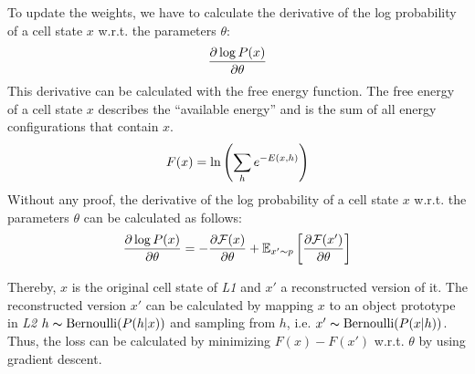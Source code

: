 To update the weights, we have to calculate the derivative of the log probability of a cell state $x$ w.r.t. the parameters $\theta$:
\begin{align}\eqlbl{l2_energy7}
	\frac{\partial \log P(x)}{\partial \theta }
\end{align}
This derivative can be calculated with the free energy function. The free energy of a cell state $x$ describes the ``available energy'' and is the sum of all energy configurations that contain $x$.
\begin{align}\eqlbl{l2_energy8}
	F(x) = \ln \left( \sum_h e^{-E(x,h)} \right)
\end{align}
Without any proof, the derivative of the log probability of a cell state $x$ w.r.t. the parameters $\theta$ can be calculated as follows:
\begin{align}\eqlbl{l2_energy9}
	\frac{\partial \log P(x)}{\partial \theta } = - \frac{\partial \mathcal{F}(x)}{\partial \theta} + \mathbb{E}_{x' \sim p} \left[ \frac{\partial \mathcal{F}(x')}{\partial \theta}  \right]
\end{align}

Thereby, $x$ is the original cell state of \emph{L1} and $x'$ a reconstructed version of it.
The reconstructed version $x'$ can be calculated by mapping $x$ to an object prototype in \emph{L2}  $h \thicksim \text{Bernoulli}(P(h | x) )$ and sampling from $h$, i.e. $x' \thicksim \text{Bernoulli}(P(x | h))$.
Thus, the loss can be calculated by minimizing $F(x) - F(x')$ w.r.t. $\theta$ by using gradient descent.





